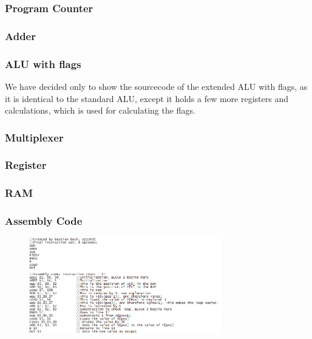 \documentclass[12pt,a4paper]{article}
\begin{document}
\subsubsection{Program Counter}
	
	\newpage
\subsubsection{Adder}
	
	\newpage
\subsubsection{ALU with flags}
	We have decided only to show the sourcecode of the extended ALU with flags, as it is identical to the standard ALU, except it holds a few more registers and calculations, which is used for calculating the flags.\\
	
\subsubsection{Multiplexer}
	
\subsubsection{Register}
	
\subsubsection{RAM}
	
	\newpage
\subsubsection{Assembly Code}
	\begin{figure}[h!]
    \includegraphics[width=0.75\textwidth]{screenshot_assembly.png}
\end{figure}
\end{document}
